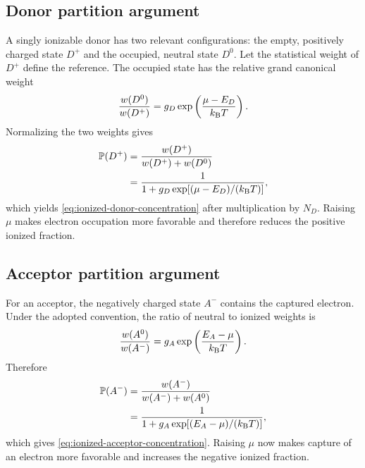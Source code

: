 \subsection{Donor partition argument}

A singly ionizable donor has two relevant configurations: the empty, positively
charged state $D^+$ and the occupied, neutral state $D^0$.  Let the statistical
weight of $D^+$ define the reference.  The occupied state has the relative grand
canonical weight
\begin{equation}
  \frac{w(D^0)}{w(D^+)}
  =g_D\exp\left(\frac{\mu-E_D}{k_{\mathrm B} T}\right).
  \label{eq:donor-relative-statistical-weight}
\end{equation}
Normalizing the two weights gives
\begin{equation}
\begin{aligned}
  \mathbb P(D^+)
  &=\frac{w(D^+)}{w(D^+)+w(D^0)}\\
  &=\frac{1}
   {1+g_D\exp[(\mu-E_D)/(k_{\mathrm B} T)]},
\end{aligned}
  \label{eq:donor-ionization-probability-derivation}
\end{equation}
which yields \cref{eq:ionized-donor-concentration} after multiplication by
$N_D$.  Raising $\mu$ makes electron occupation more favorable and therefore
reduces the positive ionized fraction.

\subsection{Acceptor partition argument}

For an acceptor, the negatively charged state $A^-$ contains the captured
electron.  Under the adopted convention, the ratio of neutral to ionized
weights is
\begin{equation}
  \frac{w(A^0)}{w(A^-)}
  =g_A\exp\left(\frac{E_A-\mu}{k_{\mathrm B} T}\right).
  \label{eq:acceptor-relative-statistical-weight}
\end{equation}
Therefore
\begin{equation}
\begin{aligned}
  \mathbb P(A^-)
  &=\frac{w(A^-)}{w(A^-)+w(A^0)}\\
  &=\frac{1}
   {1+g_A\exp[(E_A-\mu)/(k_{\mathrm B} T)]},
\end{aligned}
  \label{eq:acceptor-ionization-probability-derivation}
\end{equation}
which gives \cref{eq:ionized-acceptor-concentration}.  Raising $\mu$ now makes
capture of an electron more favorable and increases the negative ionized
fraction.

